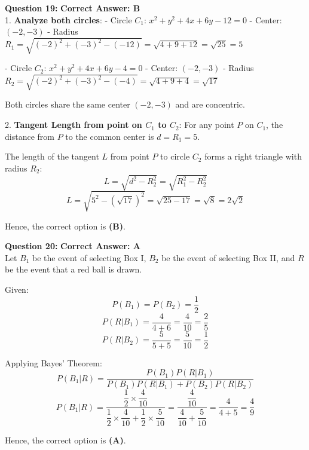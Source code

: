 \documentclass[11pt,a4paper]{article}
\begin{document}
\begin{tcolorbox}[solbox]
\textbf{\textcolor{primaryDark}{Question 19:}} \hfill \textbf{\textcolor{l1Green}{Correct Answer: B}}\\
\vspace{4pt}
1. \textbf{Analyze both circles}:
- Circle $C_1$: $x^2 + y^2 + 4x + 6y - 12 = 0$
  - Center: $(-2, -3)$
  - Radius $R_1 = \sqrt{(-2)^2 + (-3)^2 - (-12)} = \sqrt{4 + 9 + 12} = \sqrt{25} = 5$

- Circle $C_2$: $x^2 + y^2 + 4x + 6y - 4 = 0$
  - Center: $(-2, -3)$
  - Radius $R_2 = \sqrt{(-2)^2 + (-3)^2 - (-4)} = \sqrt{4 + 9 + 4} = \sqrt{17}$

Both circles share the same center $(-2, -3)$ and are concentric.

2. \textbf{Tangent Length from point on $C_1$ to $C_2$}:
For any point $P$ on $C_1$, the distance from $P$ to the common center is $d = R_1 = 5$.

The length of the tangent $L$ from point $P$ to circle $C_2$ forms a right triangle with radius $R_2$:
$$L = \sqrt{d^2 - R_2^2} = \sqrt{R_1^2 - R_2^2}$$
$$L = \sqrt{5^2 - (\sqrt{17})^2} = \sqrt{25 - 17} = \sqrt{8} = 2\sqrt{2}$$

Hence, the correct option is \textbf{(B)}.
\end{tcolorbox}

\begin{tcolorbox}[solbox]
\textbf{\textcolor{primaryDark}{Question 20:}} \hfill \textbf{\textcolor{l1Green}{Correct Answer: A}}\\
\vspace{4pt}
Let $B_1$ be the event of selecting Box I, $B_2$ be the event of selecting Box II, and $R$ be the event that a red ball is drawn.

Given:
$$P(B_1) = P(B_2) = \frac{1}{2}$$
$$P(R | B_1) = \frac{4}{4 + 6} = \frac{4}{10} = \frac{2}{5}$$
$$P(R | B_2) = \frac{5}{5 + 5} = \frac{5}{10} = \frac{1}{2}$$

Applying Bayes' Theorem:
$$P(B_1 | R) = \frac{P(B_1) P(R | B_1)}{P(B_1) P(R | B_1) + P(B_2) P(R | B_2)}$$
$$P(B_1 | R) = \frac{\dfrac{1}{2} \times \dfrac{4}{10}}{\dfrac{1}{2} \times \dfrac{4}{10} + \dfrac{1}{2} \times \dfrac{5}{10}} = \frac{\dfrac{4}{10}}{\dfrac{4}{10} + \dfrac{5}{10}} = \frac{4}{4 + 5} = \frac{4}{9}$$

Hence, the correct option is \textbf{(A)}.
\end{tcolorbox}
\end{document}
